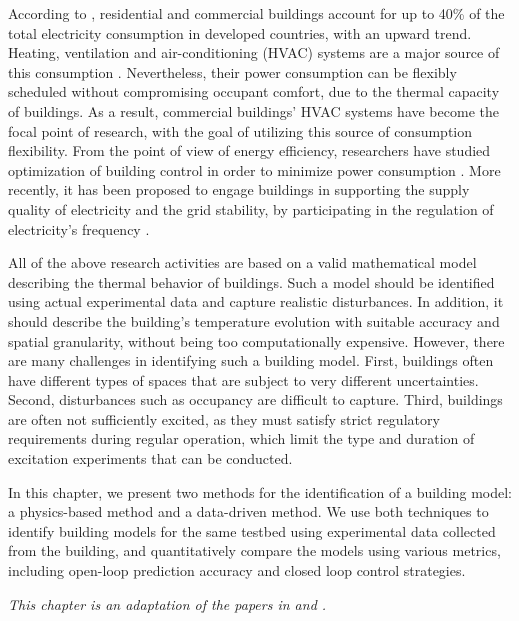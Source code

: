 \documentclass[../../thesis.tex]{subfiles}
\begin{document}
According to \cite{Perez-Lombard:2008aa}, residential and commercial buildings account for up to 40\% of the total electricity consumption in developed countries, with an upward trend. Heating, ventilation and air-conditioning (HVAC) systems are a major source of this consumption \cite{USenergy:2017}. %
Nevertheless, their power consumption can be flexibly scheduled without compromising occupant comfort, due to the thermal capacity of buildings. 
As a result, commercial buildings' HVAC systems have become the focal point of research, with the goal of utilizing this source of consumption flexibility. From the point of view of energy efficiency, researchers have studied optimization of building control in order to minimize power consumption \cite{Siroky:2011aa, Parisio:2014aa}.  
More recently, it has been proposed to engage buildings in supporting the supply quality of electricity and the grid stability, by participating in the regulation of electricity's frequency \cite{Balandat:2014contractdesign, Lin:2015exp, Vrettos:2014aggregation, Baccino:2014aa}.


All of the above research activities are based on a valid mathematical model describing the thermal behavior of buildings.  
Such a model should be identified using actual experimental data and capture realistic disturbances. 
In addition, it should describe the building's temperature evolution with suitable accuracy and spatial granularity, without being too computationally expensive.
However, there are many challenges in identifying such a building model. 
First, buildings often have different types of spaces that are subject to very different uncertainties. 
Second, disturbances such as occupancy are difficult to capture. 
Third, buildings are often not sufficiently excited, as they must satisfy strict regulatory requirements during regular operation, which limit the type and duration of excitation experiments that can be conducted.  

In this chapter, we present two methods for the identification of a building model: a physics-based method and a data-driven method. 
We use both techniques to identify building models for the same testbed using experimental data collected from the building, and quantitatively compare the models using various metrics, including open-loop prediction accuracy and closed loop control strategies. 

\noindent
\textit{This chapter is an adaptation of the papers in \cite{Qie} and \cite{Zhou:2017modelcomp}.}







\end{document}
